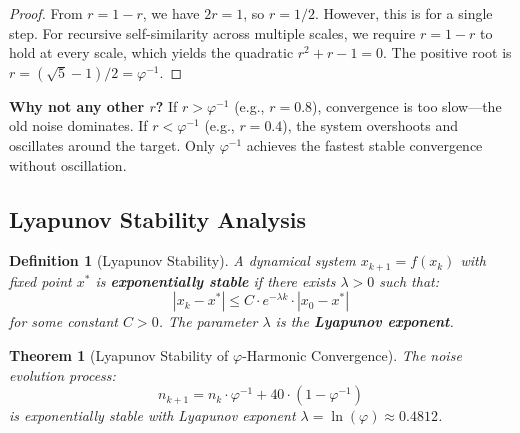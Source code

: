 \documentclass[11pt,a4paper]{article}
\newtheorem{theorem}{Theorem}[section]
\newtheorem{definition}{Definition}[section]
\begin{document}
\begin{proof}
From $r = 1 - r$, we have $2r = 1$, so $r = 1/2$. However, this is for a single step. For recursive self-similarity across multiple scales, we require $r = 1 - r$ to hold at every scale, which yields the quadratic $r^2 + r - 1 = 0$. The positive root is $r = (\sqrt{5}-1)/2 = \varphi^{-1}$.
\end{proof}

\textbf{Why not any other $r$?} If $r > \varphi^{-1}$ (e.g., $r = 0.8$), convergence is too slow—the old noise dominates. If $r < \varphi^{-1}$ (e.g., $r = 0.4$), the system overshoots and oscillates around the target. Only $\varphi^{-1}$ achieves the fastest stable convergence without oscillation.

\subsection{Lyapunov Stability Analysis}

\begin{definition}[Lyapunov Stability]
A dynamical system $x_{k+1} = f(x_k)$ with fixed point $x^*$ is \textbf{exponentially stable} if there exists $\lambda > 0$ such that:
\begin{equation}
    |x_k - x^*| \leq C \cdot e^{-\lambda k} \cdot |x_0 - x^*|
\end{equation}
for some constant $C > 0$. The parameter $\lambda$ is the \textbf{Lyapunov exponent}.
\end{definition}

\begin{theorem}[Lyapunov Stability of $\varphi$-Harmonic Convergence]
The noise evolution process:
\begin{equation}
    n_{k+1} = n_k \cdot \varphi^{-1} + 40 \cdot (1 - \varphi^{-1})
\end{equation}
is exponentially stable with Lyapunov exponent $\lambda = \ln(\varphi) \approx 0.4812$.
\end{theorem}
\end{document}
